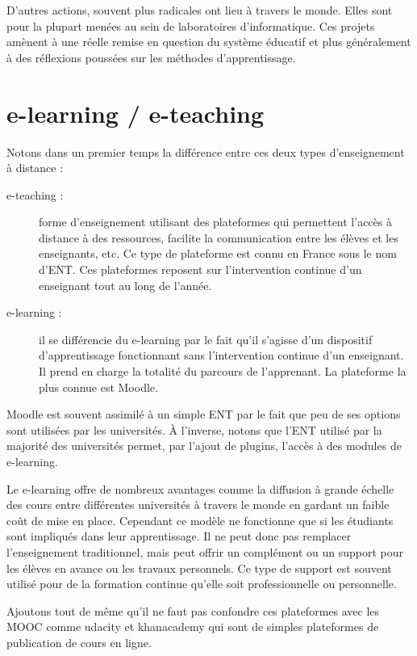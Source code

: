 D'autres actions, souvent plus radicales ont lieu à travers le monde. Elles sont pour la plupart menées au sein de laboratoires d'informatique. Ces projets amènent à une réelle remise en question du système éducatif et plus généralement à des réflexions poussées sur les méthodes d'apprentissage.

\section{e-learning / e-teaching}

Notons dans un premier temps la différence entre ces deux types d'enseignement à distance :

\begin{description}
  \item[e-teaching :] forme d'enseignement utilisant des plateformes qui permettent l'accès à distance à des ressources, facilite la communication entre les élèves et les enseignants, etc. Ce type de plateforme est connu en France sous le nom d'\gls{ENT}. Ces plateformes reposent sur l’intervention continue d'un enseignant tout au long de l'année.
  \item[e-learning :] il se différencie du e-learning par le fait qu'il s'agisse d'un dispositif d'apprentissage fonctionnant sans l'intervention continue d'un enseignant. Il prend en charge la totalité du parcours de l'apprenant. La plateforme la plus connue est Moodle\cite{moodle_website}.
\end{description}

Moodle est souvent assimilé à un simple ENT par le fait que peu de ses options sont utilisées par les universités. À l'inverse, notons que l'ENT utilisé par la majorité des universités permet, par l'ajout de plugins, l'accès à des modules de e-learning.

Le e-learning offre de nombreux avantages comme la diffusion à grande échelle des cours entre différentes universités à travers le monde en gardant un faible coût de mise en place. Cependant ce modèle ne fonctionne que si les étudiants sont impliqués dans leur apprentissage. Il ne peut donc pas remplacer l'enseignement traditionnel, mais peut offrir un complément ou un support pour les élèves en avance ou les travaux personnels. Ce type de support est souvent utilisé pour de la formation continue qu'elle soit professionnelle ou personnelle.

Ajoutons tout de même qu'il ne faut pas confondre ces plateformes avec
les \gls{MOOC} comme udacity et khanacademy qui sont de simples
plateformes de publication de cours en ligne.

